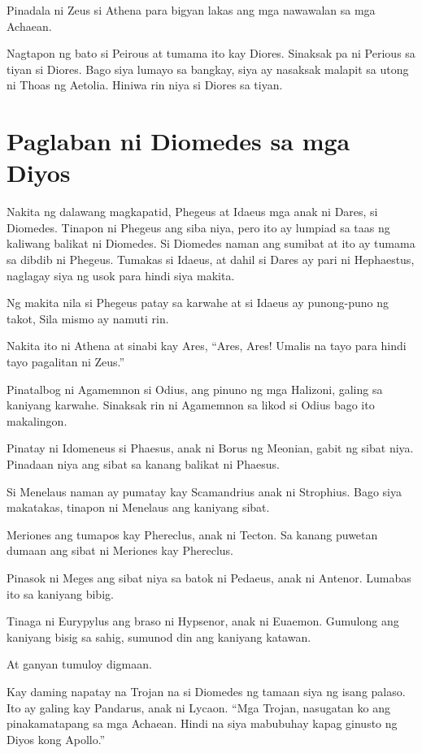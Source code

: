 \documentclass[12pt,letterpaper]{report}
\begin{document}
Pinadala ni Zeus si Athena para bigyan lakas ang mga nawawalan sa mga Achaean.

Nagtapon ng bato si Peirous at tumama ito kay Diores. Sinaksak pa ni Perious sa tiyan si Diores. Bago siya lumayo sa bangkay, siya ay nasaksak malapit sa utong ni Thoas ng Aetolia. Hiniwa rin niya si Diores sa tiyan. \pagebreak
\chapter{Paglaban ni Diomedes sa mga Diyos}
Nakita ng dalawang magkapatid, Phegeus at Idaeus mga anak ni Dares, si Diomedes. Tinapon ni Phegeus ang siba niya, pero ito ay lumpiad sa taas ng kaliwang balikat ni Diomedes. Si Diomedes naman ang sumibat at ito ay tumama sa dibdib ni Phegeus. Tumakas si Idaeus, at dahil si Dares ay pari ni Hephaestus, naglagay siya ng usok para hindi siya makita.

Ng makita nila si Phegeus patay sa karwahe at si Idaeus ay punong-puno ng takot, Sila mismo ay namuti rin.

Nakita ito ni Athena at sinabi kay Ares, ``Ares, Ares! Umalis na tayo para hindi tayo pagalitan ni Zeus.''

Pinatalbog ni Agamemnon si Odius, ang pinuno ng mga Halizoni, galing sa kaniyang karwahe. Sinaksak rin ni Agamemnon sa likod si Odius bago ito makalingon.

Pinatay ni Idomeneus si Phaesus, anak ni Borus ng Meonian, gabit ng sibat niya. Pinadaan niya ang sibat sa kanang balikat ni Phaesus.

Si Menelaus naman ay pumatay kay Scamandrius anak ni Strophius. Bago siya makatakas, tinapon ni Menelaus ang kaniyang sibat.

Meriones ang tumapos kay Phereclus, anak ni Tecton. Sa kanang puwetan dumaan ang sibat ni Meriones kay Phereclus.

Pinasok ni Meges ang sibat niya sa batok ni Pedaeus, anak ni Antenor. Lumabas ito sa kaniyang bibig.

Tinaga ni Eurypylus ang braso ni Hypsenor, anak ni Euaemon. Gumulong ang kaniyang bisig sa sahig, sumunod din ang kaniyang katawan.

At ganyan tumuloy digmaan.

Kay daming napatay na Trojan na si Diomedes ng tamaan siya ng isang palaso. Ito ay galing kay Pandarus, anak ni Lycaon. ``Mga Trojan, nasugatan ko ang pinakamatapang sa mga Achaean. Hindi na siya mabubuhay kapag ginusto ng Diyos kong Apollo.''
\end{document}
